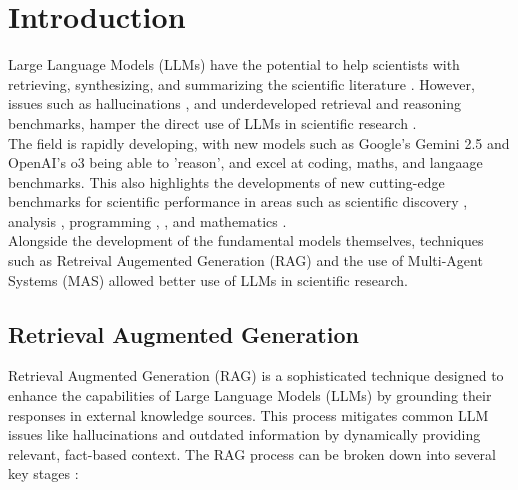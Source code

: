 \section{Introduction}
\label{sec:introduction}

Large Language Models (LLMs) have the potential to help scientists with retrieving, synthesizing, and summarizing the scientific literature \cite{skarlinski_language_2024}. 
However, issues such as hallucinations \cite{shi_large_nodate} \cite{xu_hallucination_2025}, and underdeveloped retrieval and reasoning benchmarks, hamper the direct use of LLMs in scientific research . \\

The field is rapidly developing, with new models such as Google's Gemini 2.5 and OpenAI's o3 being able to 'reason', and excel at coding, maths, and langaage benchmarks. 
This also highlights the developments of new cutting-edge benchmarks for scientific performance in areas such as scientific discovery \cite{shojaee_llm-srbench_2025}, analysis \cite{cai_sciassess_2024}, programming \cite{openai_competitive_2025}, \cite{quan_codeelo_2025}, and mathematics \cite{liu_mathbench_2024}. \\

Alongside the development of the fundamental models themselves, techniques such as Retreival Augemented Generation (RAG) and the use of Multi-Agent Systems (MAS) allowed better use of LLMs in scientific research. \\

\subsection{Retrieval Augmented Generation}
Retrieval Augmented Generation (RAG) is a sophisticated technique designed to enhance the capabilities of Large Language Models (LLMs) by grounding their responses in external knowledge sources. This process mitigates common LLM issues like hallucinations and outdated information by dynamically providing relevant, fact-based context. The RAG process can be broken down into several key stages \cite{gupta_comprehensive_2024} \cite{lewis_retrieval-augmented_2021}:

